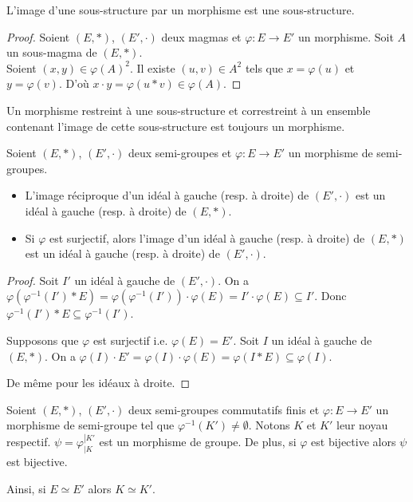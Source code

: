 \begin{proposition}
L'image d'une sous-structure par un morphisme est une sous-structure.
\end{proposition}

\begin{proof}
Soient $(E, *)$, $(E', \cdot)$ deux magmas et $\varphi: E \rightarrow E'$ un morphisme.
Soit $A$ un sous-magma de $(E, *)$. \\
Soient $(x, y) \in \varphi(A)^2$. Il existe $(u, v) \in A^2$ tels que
$x = \varphi(u)$ et $y = \varphi(v)$.
D'où $x \cdot y = \varphi(u * v) \in \varphi(A)$.
\end{proof}

\begin{corollaire}
Un morphisme restreint à une sous-structure et correstreint à un ensemble contenant l'image de cette sous-structure est toujours un morphisme.
\end{corollaire}

\begin{proposition}
Soient $(E, *)$, $(E', \cdot)$ deux semi-groupes et $\varphi: E \rightarrow E'$
un morphisme de semi-groupes.
\begin{itemize}
\item L'image réciproque d'un idéal à gauche (resp. à droite) de $(E', \cdot)$
    est un idéal à gauche (resp. à droite) de $(E, *)$.
\item Si $\varphi$ est surjectif, alors
    l'image d'un idéal à gauche (resp. à droite) de $(E, *)$
    est un idéal à gauche (resp. à droite) de $(E', \cdot)$.
\end{itemize}
\end{proposition}

\begin{proof}
Soit $I'$ un idéal à gauche de $(E', \cdot)$.
On a $\varphi(\varphi^{-1}(I') * E)
= \varphi(\varphi^{-1}(I')) \cdot \varphi(E)
= I' \cdot \varphi(E)
\subseteq I'$.
Donc $\varphi^{-1}(I') * E \subseteq \varphi^{-1}(I')$.

Supposons que $\varphi$ est surjectif i.e. $\varphi(E) = E'$.
Soit $I$ un idéal à gauche de $(E, *)$.
On a $\varphi(I) \cdot E'
= \varphi(I) \cdot \varphi(E)
= \varphi(I * E)
\subseteq \varphi(I)$.

De même pour les idéaux à droite.
\end{proof}

\begin{theoreme}
Soient $(E, *)$, $(E', \cdot)$ deux semi-groupes commutatifs finis et
$\varphi: E \rightarrow E'$ un morphisme de semi-groupe tel que
$\varphi^{-1}(K') \neq \emptyset$.
Notons $K$ et $K'$ leur noyau respectif.
$\psi = \varphi_{\left|K\right.}^{\left|K'\right.}$ est un morphisme de groupe.
De plus, si $\varphi$ est bijective alors $\psi$ est bijective.

Ainsi, si $E \simeq E'$ alors $K \simeq K'$.
\end{theoreme}

